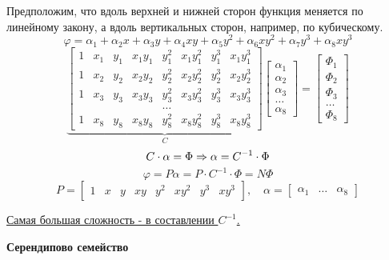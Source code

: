 		Предположим, что вдоль верхней и нижней сторон функция меняется по линейному закону, а вдоль вертикальных сторон, например, по кубическому.
		\[
		\varphi=\alpha_1+\alpha_2x+\alpha_3y+\alpha_4xy+\alpha_5y^2+\alpha_6xy^2+\alpha_7y^3+\alpha_8xy^3
		\]
		\[
		\underbrace{\begin{bmatrix}
			1 & x_1 & y_1 & x_1y_1 & y_1^2 & x_1y_1^2 & y_1^3 & x_1y_1^3 \\
			1 & x_2 & y_2 & x_2y_2 & y_2^2 & x_2y_2^2 & y_2^3 & x_2y_2^3 \\
			1 & x_3 & y_3 & x_3y_3 & y_3^2 & x_3y_3^2 & y_3^3 & x_3y_3^3 \\
			& & &  & \dots& & &  \\
			1 & x_8 & y_8 & x_8y_8 & y_8^2 & x_8y_8^2 & y_8^3 & x_8y_8^3 
		\end{bmatrix}}_C \begin{bmatrix}
		\alpha_1 \\ \alpha_2 \\ \alpha_3 \\ \dots \\ \alpha_8 
		\end{bmatrix} = \begin{bmatrix}
		\Phi_1 \\ \Phi_2 \\ \Phi_3 \\ \dots \\ \Phi_8
		\end{bmatrix}
		\]
		\[
		C\cdot\alpha=\Phi \Rightarrow \alpha=C^{-1} \cdot \Phi \\
		\]
		\[
		\varphi=P\alpha=P\cdot C^{-1} \cdot \Phi = N\Phi
		\]
		\[
		P=\begin{bmatrix}
			1 & x & y & xy & y^2 & xy^2 & y^3 & xy^3
		\end{bmatrix}, \quad \alpha=\begin{bmatrix}
		\alpha_1 & \dots & \alpha_8
		\end{bmatrix}
		\]
		
		\underline{Самая большая сложность - в составлении $C^{-1}$.}
		
		\newpage
		\begin{center}
			\textbf{Серендипово семейство}
		\end{center}

		\begin{center}
		\end{center}
		
